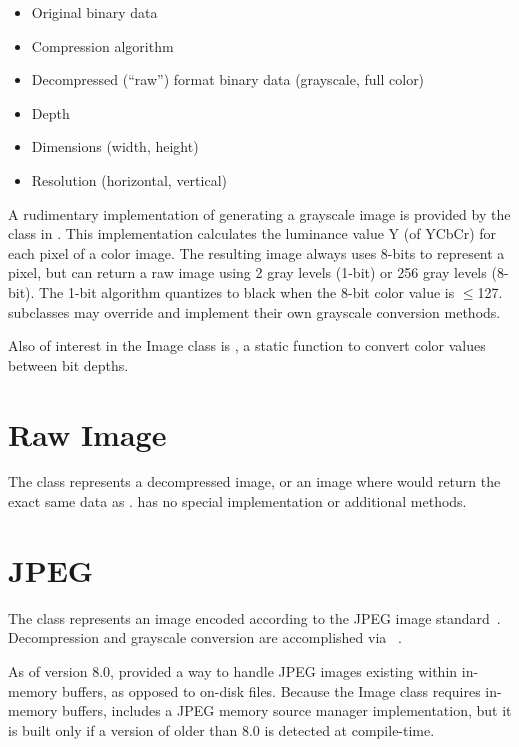 \begin{itemize}
\item Original binary data
\item Compression algorithm
\item Decompressed (``raw'') format binary data (grayscale, full color)
\item Depth
\item Dimensions (width, height)
\item Resolution (horizontal, vertical)
\end{itemize}

A rudimentary implementation of generating a grayscale image is provided by the
 class in .  This implementation calculates the luminance value Y (of YCbCr) for 
each pixel of a color image.  The resulting image always uses 8-bits to 
represent a pixel, but can return a raw image using 2 gray levels (1-bit) or 256 
gray levels (8-bit).  The 1-bit algorithm quantizes to black when the 8-bit 
color value is \ensuremath{\leq}127.   subclasses  may override and 
implement their own grayscale conversion methods.

Also of interest in the Image class is 
, a static function to 
convert color values between bit depths.

\section{Raw Image}
\label{sec-rawimage}
The  class represents a decompressed image, or an image where
 would return the exact same data
as .   has no special implementation or additional methods.

\section{JPEG}
\label{sec-image-jpeg}
The  class represents an image encoded according to the JPEG image 
standard~\cite{jpeg}.  Decompression and grayscale conversion are accomplished
via ~\cite{libjpeg}.

As of version 8.0,  provided a way to handle JPEG images 
existing within in-memory buffers, as opposed to on-disk files.  Because the 
Image class requires in-memory buffers,  includes a JPEG memory
source manager implementation, but it is built only if a version of 
 older than 8.0 is detected at compile-time.


